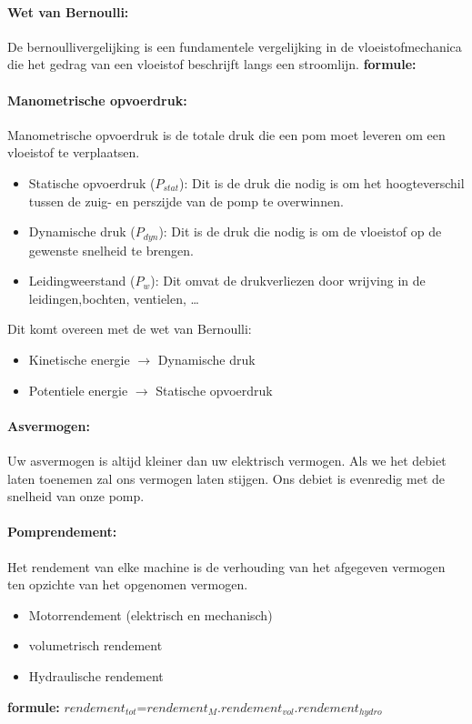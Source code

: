 \documentclass[12pt]{article}
\begin{document}
\paragraph{Wet van Bernoulli:}
De bernoullivergelijking is een fundamentele vergelijking in de vloeistofmechanica die het gedrag van een vloeistof beschrijft langs een stroomlijn.
\textbf{formule:}
\paragraph{Manometrische opvoerdruk:}
Manometrische opvoerdruk is de totale druk die een pom moet leveren om een vloeistof te verplaatsen. \begin{itemize}
    \item Statische opvoerdruk (${P_{stat}}$): Dit is de druk die nodig is om het hoogteverschil tussen de zuig- en perszijde van de pomp te overwinnen.
    \item Dynamische druk ({$P_{dyn}$}): Dit is de druk die nodig is om de vloeistof op de gewenste snelheid te brengen.
    \item Leidingweerstand ({$P_w$}): Dit omvat de drukverliezen door wrijving in de leidingen,bochten, ventielen, \dots
\end{itemize}
Dit komt overeen met de wet van Bernoulli:\begin{itemize}
    \item Kinetische energie $\rightarrow$ Dynamische druk
    \item Potentiele energie $\rightarrow$ Statische opvoerdruk
\end{itemize}
\paragraph{Asvermogen:}
Uw asvermogen is altijd kleiner dan uw elektrisch vermogen.
Als we het debiet laten toenemen zal ons vermogen laten stijgen.
Ons debiet is evenredig met de snelheid van onze pomp.
\paragraph{Pomprendement:}
Het rendement van elke machine is de verhouding van het afgegeven vermogen ten opzichte van het opgenomen vermogen.
\begin{itemize}
    \item Motorrendement  (elektrisch en mechanisch)
    \item volumetrisch rendement
    \item Hydraulische rendement
\end{itemize}
\textbf{formule:} $rendement_{tot}$=$rendement_M$.$rendement_{vol}$.$rendement_{hydro}$
\end{document}
